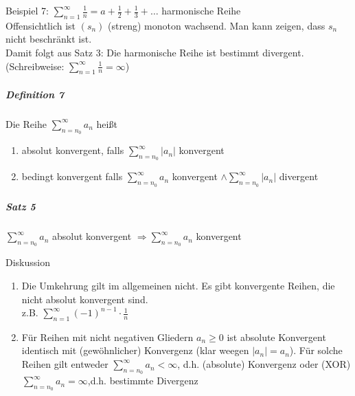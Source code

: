 \documentclass[a4paper]{scrartcl}
\begin{document}
Beispiel 7: $\sum\limits_{n=1}^{\infty} \frac{1}{n} = a + \frac{1}{2} + \frac{1}{3} + \dots$ harmonische Reihe\\
Offensichtlich ist $(s_n)$ (streng) monoton wachsend. Man kann zeigen, dass $s_n$ nicht beschränkt ist.\\
Damit folgt aus Satz 3: Die harmonische Reihe ist bestimmt divergent.
(Schreibweise: $\sum\limits_{n=1}^{\infty} \frac{1}{n} = \infty$)

\subparagraph{Definition 7} Die Reihe $\sum\limits_{n=n_0}^{\infty} a_n$ heißt 
\begin{enumerate}
\item absolut konvergent, falls $\sum\limits_{n=n_0}^{\infty} \lvert a_n\rvert$ konvergent
\item bedingt konvergent falls $\sum\limits_{n=n_0}^{\infty} a_n$ konvergent $\wedge \sum\limits_{n=n_0}^{\infty} \lvert a_n \rvert$ divergent
\end{enumerate}

\subparagraph{Satz 5} $\sum\limits_{n=n_0}^{\infty} a_n$ absolut konvergent $\Rightarrow \sum\limits_{n=n_0}^{\infty} a_n$ konvergent

Diskussion
\begin{enumerate}
\item Die Umkehrung gilt im allgemeinen nicht. Es gibt konvergente Reihen, die nicht absolut konvergent sind.\\
z.B. $\sum\limits_{n=1}^{\infty} (-1)^{n-1} \cdot \frac{1}{n}$
\item Für Reihen mit nicht negativen Gliedern $a_n \geq 0$ ist absolute Konvergent identisch mit (gewöhnlicher) Konvergenz (klar weegen $\lvert a_n \rvert = a_n$). Für solche Reihen gilt entweder $\sum\limits_{n=n_0}^{\infty} a_n < \infty$, d.h. (absolute) Konvergenz oder (XOR) $\sum\limits_{n=n_0}^{\infty} a_n = \infty$,d.h. bestimmte Divergenz
\end{enumerate}
\end{document}
